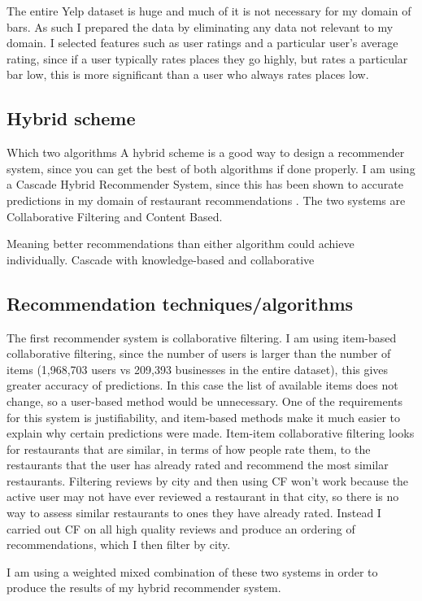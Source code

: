 \documentclass[conference]{IEEEtran}
\begin{document}
The entire Yelp dataset is huge and much of it is not necessary for my domain of bars.
As such I prepared the data by eliminating any data not relevant to my domain.
I selected features such as user ratings and a particular user's average rating,
since if a user typically rates places they go highly, but rates a particular bar low,
this is more significant than a user who always rates places low.

\subsection{Hybrid scheme}
Which two algorithms
A hybrid scheme is a good way to design a recommender system, since you can get the
best of both algorithms if done properly. 
I am using a Cascade Hybrid Recommender System, since this has been shown to accurate predictions 
in my domain of restaurant recommendations \cite{burke2007hybrid}. 
The two systems are Collaborative Filtering and Content Based. 

Meaning better recommendations than either algorithm could achieve individually.
Cascade with knowledge-based and collaborative


\subsection{Recommendation techniques/algorithms}
The first recommender system is collaborative filtering.
I am using item-based collaborative filtering, since the number of users is larger than the number of items 
(1,968,703 users vs 209,393 businesses in the entire dataset), this gives greater accuracy of predictions. 
In this case the list of available items does not change, so a user-based method would be unnecessary. 
One of the requirements for this system is justifiability, and item-based methods make it much easier to 
explain why certain predictions were made. 
Item-item collaborative filtering looks for restaurants that are similar, in terms of how people rate them, 
to the restaurants that the user has already rated and recommend the most similar restaurants. 
Filtering reviews by city and then using CF won't work because the active user may not have ever reviewed a restaurant 
in that city, so there is no way to assess similar restaurants to ones they have already rated. 
Instead I carried out CF on all high quality reviews and produce an ordering of recommendations, which I then filter 
by city. 

I am using a weighted mixed combination of these two systems in order to produce the results
of my hybrid recommender system.
\end{document}
